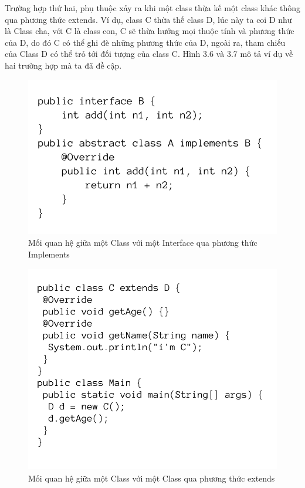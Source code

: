 \documentclass[12pt]{report}
\begin{document}
\noindent Trường hợp thứ hai, phụ thuộc xảy ra khi một class thừa kế một class khác thông qua phương thức extends. Ví dụ, class C thừa thế class D, lúc này ta coi D như là Class cha, với C là class con, C sẽ thừa hưởng mọi thuộc tính và phương thức của  D, do đó C có thể ghi đè những phương thức của D, ngoài ra, tham chiếu của Class D có thể trỏ tới đối tượng của class C. Hình 3.6 và 3.7 mô tả ví dụ về hai trường hợp mà ta đã đề cập.
\begin{figure}[!htbp]
	\centering
	\includegraphics[scale=0.36]{images/AimplementsB}
	\caption{Mối quan hệ giữa một Class với một Interface qua phương thức Implements}
	\label{fig:A_implemets_B}
\end{figure}
\begin{figure}[!htbp]
	\centering
	\includegraphics[scale=0.36]{images/CextendD}
	\caption{Mối quan hệ giữa một Class với một Class qua phương thức extends}
	\label{fig:CextendD}
\end{figure}
\end{document}
